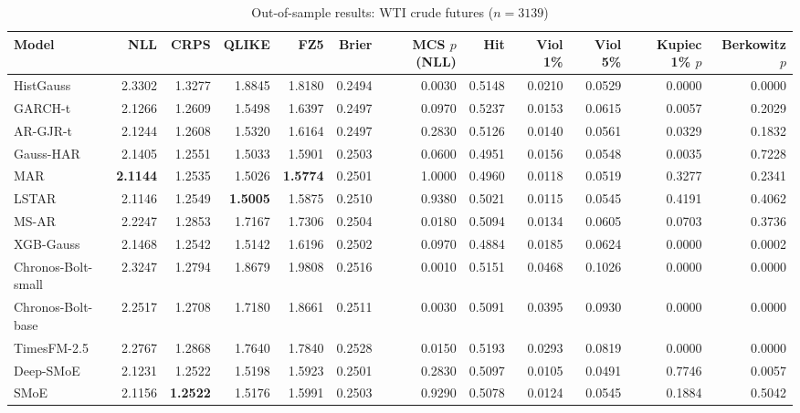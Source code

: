\begin{table}[!htbp]\centering\scriptsize
\caption{Out-of-sample results: WTI crude futures ($n=3139$)}\label{tab:asset_cl_fut}
\begin{adjustbox}{max width=\textwidth}
\begin{tabular}{lrrrrrrrrrrr}
\toprule
Model & NLL & CRPS & QLIKE & FZ5 & Brier & MCS $p$ (NLL) & Hit & Viol 1\% & Viol 5\% & Kupiec 1\% $p$ & Berkowitz $p$\\
\midrule
HistGauss & 2.3302 & 1.3277 & 1.8845 & 1.8180 & 0.2494 & 0.0030 & 0.5148 & 0.0210 & 0.0529 & 0.0000 & 0.0000\\
GARCH-t & 2.1266 & 1.2609 & 1.5498 & 1.6397 & 0.2497 & 0.0970 & 0.5237 & 0.0153 & 0.0615 & 0.0057 & 0.2029\\
AR-GJR-t & 2.1244 & 1.2608 & 1.5320 & 1.6164 & 0.2497 & 0.2830 & 0.5126 & 0.0140 & 0.0561 & 0.0329 & 0.1832\\
Gauss-HAR & 2.1405 & 1.2551 & 1.5033 & 1.5901 & 0.2503 & 0.0600 & 0.4951 & 0.0156 & 0.0548 & 0.0035 & 0.7228\\
MAR & \textbf{2.1144} & 1.2535 & 1.5026 & \textbf{1.5774} & 0.2501 & 1.0000 & 0.4960 & 0.0118 & 0.0519 & 0.3277 & 0.2341\\
LSTAR & 2.1146 & 1.2549 & \textbf{1.5005} & 1.5875 & 0.2510 & 0.9380 & 0.5021 & 0.0115 & 0.0545 & 0.4191 & 0.4062\\
MS-AR & 2.2247 & 1.2853 & 1.7167 & 1.7306 & 0.2504 & 0.0180 & 0.5094 & 0.0134 & 0.0605 & 0.0703 & 0.3736\\
XGB-Gauss & 2.1468 & 1.2542 & 1.5142 & 1.6196 & 0.2502 & 0.0970 & 0.4884 & 0.0185 & 0.0624 & 0.0000 & 0.0002\\
Chronos-Bolt-small & 2.3247 & 1.2794 & 1.8679 & 1.9808 & 0.2516 & 0.0010 & 0.5151 & 0.0468 & 0.1026 & 0.0000 & 0.0000\\
Chronos-Bolt-base & 2.2517 & 1.2708 & 1.7180 & 1.8661 & 0.2511 & 0.0030 & 0.5091 & 0.0395 & 0.0930 & 0.0000 & 0.0000\\
TimesFM-2.5 & 2.2767 & 1.2868 & 1.7640 & 1.7840 & 0.2528 & 0.0150 & 0.5193 & 0.0293 & 0.0819 & 0.0000 & 0.0000\\
Deep-SMoE & 2.1231 & 1.2522 & 1.5198 & 1.5923 & 0.2501 & 0.2830 & 0.5097 & 0.0105 & 0.0491 & 0.7746 & 0.0057\\
SMoE & 2.1156 & \textbf{1.2522} & 1.5176 & 1.5991 & 0.2503 & 0.9290 & 0.5078 & 0.0124 & 0.0545 & 0.1884 & 0.5042\\
\bottomrule
\end{tabular}
\end{adjustbox}
\end{table}
